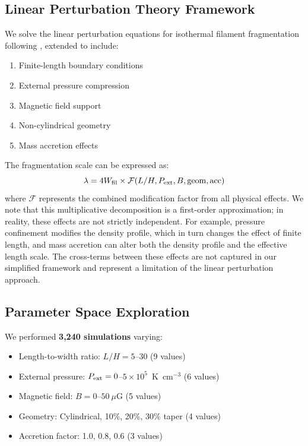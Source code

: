 \documentclass[11pt,a4paper]{article}
\begin{document}
\subsection{Linear Perturbation Theory Framework}

We solve the linear perturbation equations for isothermal filament fragmentation following \citet{Inutsuka1992}, extended to include:

\begin{enumerate}
    \item Finite-length boundary conditions \citep{Inutsuka1997}
    \item External pressure compression \citep{Fischera2012}
    \item Magnetic field support \citep{Hennebelle2013}
    \item Non-cylindrical geometry
    \item Mass accretion effects
\end{enumerate}

The fragmentation scale can be expressed as:
\begin{equation}
\lambda = 4W_{\rm fil} \times \mathcal{F}(L/H, P_{\rm ext}, B, {\rm geom}, {\rm acc})
\end{equation}
where $\mathcal{F}$ represents the combined modification factor from all physical effects. We note that this multiplicative decomposition is a first-order approximation; in reality, these effects are not strictly independent. For example, pressure confinement modifies the density profile, which in turn changes the effect of finite length, and mass accretion can alter both the density profile and the effective length scale. The cross-terms between these effects are not captured in our simplified framework and represent a limitation of the linear perturbation approach.

\subsection{Parameter Space Exploration}

We performed \textbf{3,240 simulations} varying:
\begin{itemize}
    \item Length-to-width ratio: $L/H = 5$--$30$ (9 values)
    \item External pressure: $P_{\rm ext} = 0$--$5 \times 10^5$~K~cm$^{-3}$ (6 values)
    \item Magnetic field: $B = 0$--$50~\mu$G (5 values)
    \item Geometry: Cylindrical, 10\%, 20\%, 30\% taper (4 values)
    \item Accretion factor: 1.0, 0.8, 0.6 (3 values)
\end{itemize}
\end{document}
